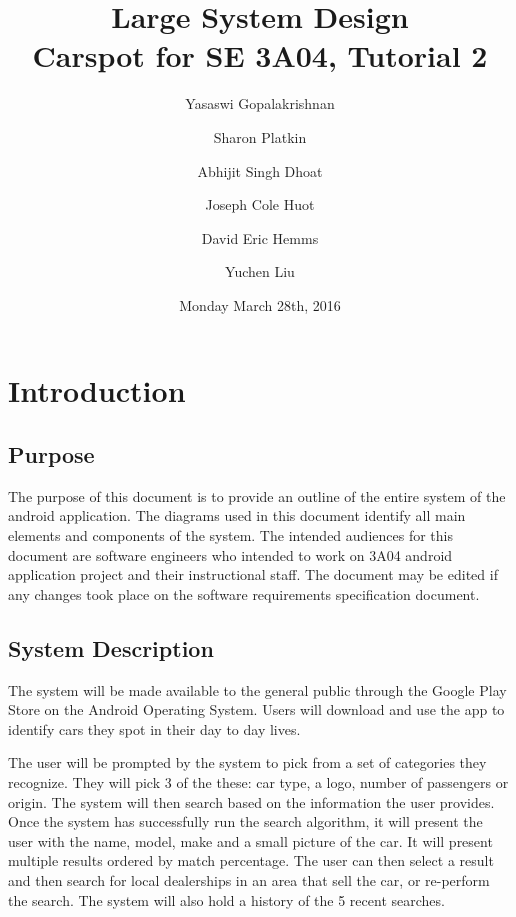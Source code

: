 \documentclass[12pt]{article}
\title{Large System Design\\
	\large Carspot for SE 3A04, Tutorial 2}
\author{
         Yasaswi Gopalakrishnan\\ \newline
         \and
         Sharon Platkin \\ \newline
         \and
         Abhijit Singh Dhoat\\ \newline
         \and
         Joseph Cole Huot\\ \newline
         \and
         David Eric Hemms\\ \newline
         \and
         Yuchen Liu\\ \newline
    }
\date{Monday March 28th, 2016}
\begin{document}
\maketitle
\newpage
\tableofcontents
\listoftables
\newpage

\section{Introduction}
\label{sec:introduction}

\subsection{Purpose}
\label{sub:purpose}

The purpose of this document is to provide an outline of the entire system of the android application. The diagrams used in this document identify all main elements and components of the system. The intended audiences for this document are software engineers who intended to work on 3A04 android application project and their instructional staff. The document may be edited if any changes took place on the software requirements specification document.


\subsection{System Description}
\label{sub:system_description}
The system will be made available to the general public through the Google Play Store on the Android Operating System. Users will download and use the app to identify cars they spot in their day to day lives. 

The user will be prompted by the system to pick from a set of categories they recognize. They will pick 3 of the these: car type, a logo, number of passengers or origin. The system will then search based on the information the user provides. Once the system has successfully run the search algorithm, it will present the user with the name, model, make and a small picture of the car. It will present multiple results ordered by match percentage. The user can then select a result and then search for local dealerships in an area that sell the car, or re-perform the search. The system will also hold a history of the 5 recent searches.
\end{document}

